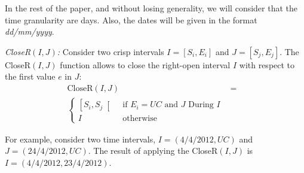 In the rest of the paper, and without losing generality, we will consider that the time granularity are days. Also, the dates will be given in the format \emph{dd/mm/yyyy}.


\begin{definition}
\emph{CloseR$\left( I, J \right)$:}
\label{def:close-a-crisp-interval-r}
Consider two crisp intervals $I= \left[S_i ,E_i \right]$ and $J= \left[S_j ,E_j \right]$. The CloseR$\left(I, J\right)$ function allows to close the right-open interval $I$ with respect to the first value $e$ in $J$:
\begin{align}
\label{eq:close-a-crisp-interval}
\mbox{CloseR} \left( I, J \right) &=& \\ 
\begin{cases}
\nonumber
\left[S_i, S_j \right[ & \mbox{ if } E_i = UC \mbox{ and } J \mbox{ During } I \\
I & \mbox{ otherwise}
\end{cases}
\end{align}
\end{definition}

For example, consider two time intervals, $I = \left(4/4/2012, UC \right)$ and $J = \left(24/4/2012, UC \right)$. The result of applying the CloseR$\left(I, J \right)$ is $I = \left(4/4/2012, 23/4/2012 \right)$.








%



